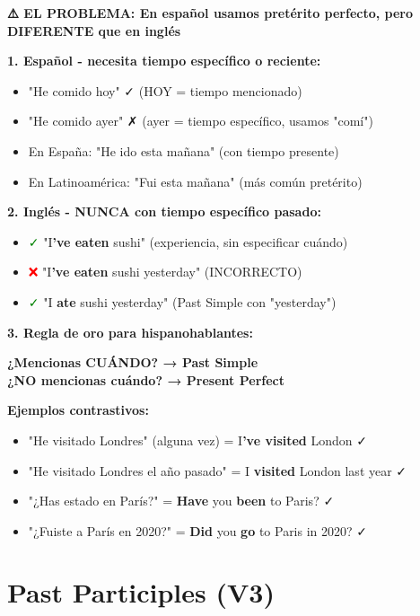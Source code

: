 \begin{comparisonbox}[title=🇪🇸 Present Perfect: La Pesadilla de los Hispanohablantes]
\textbf{⚠️ EL PROBLEMA: En español usamos pretérito perfecto, pero DIFERENTE que en inglés}

\textbf{1. Español - necesita tiempo específico o reciente:}
\begin{itemize}
    \item "He comido hoy" ✓ (HOY = tiempo mencionado)
    \item "He comido ayer" ✗ (ayer = tiempo específico, usamos "comí")
    \item En España: "He ido esta mañana" (con tiempo presente)
    \item En Latinoamérica: "Fui esta mañana" (más común pretérito)
\end{itemize}

\textbf{2. Inglés - NUNCA con tiempo específico pasado:}
\begin{itemize}
    \item \textcolor{green}{✓} "I\textbf{'ve eaten} sushi" (experiencia, sin especificar cuándo)
    \item \textcolor{red}{❌} "I\textbf{'ve eaten} sushi yesterday" (INCORRECTO)
    \item \textcolor{green}{✓} "I \textbf{ate} sushi yesterday" (Past Simple con "yesterday")
\end{itemize}

\textbf{3. Regla de oro para hispanohablantes:}
\begin{center}
\large
\textbf{¿Mencionas CUÁNDO? → Past Simple}\\
\textbf{¿NO mencionas cuándo? → Present Perfect}
\end{center}

\textbf{Ejemplos contrastivos:}
\begin{itemize}
    \item "He visitado Londres" (alguna vez) = I\textbf{'ve visited} London ✓
    \item "He visitado Londres el año pasado" = I \textbf{visited} London last year ✓
    \item "¿Has estado en París?" = \textbf{Have} you \textbf{been} to Paris? ✓
    \item "¿Fuiste a París en 2020?" = \textbf{Did} you \textbf{go} to Paris in 2020? ✓
\end{itemize}
\end{comparisonbox}

\section{Past Participles (V3)}

